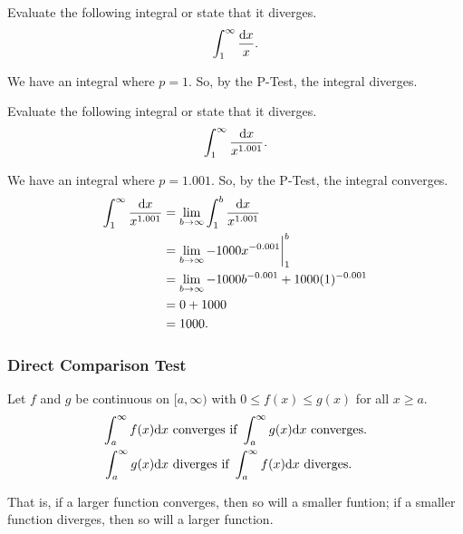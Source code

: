 \begin{example}
	Evaluate the following integral or state that it diverges.
	\begin{equation*}
		\int_{1}^{\infty}{\frac{\mathrm{d} x}{x}}.
	\end{equation*}
\end{example}
\begin{answer}
	We have an integral where $p=1$.
	So, by the P-Test, the integral diverges.
\end{answer}

\begin{example}
	Evaluate the following integral or state that it diverges.
	\begin{equation*}
		\int_{1}^{\infty}{\frac{\mathrm{d} x}{x^{1.001}}}.
	\end{equation*}
\end{example}
\begin{answer}
	We have an integral where $p=1.001$.
	So, by the P-Test, the integral converges.
	\begin{align*}
		\int_{1}^{\infty}{\frac{\mathrm{d} x}{x^{1.001}}} &= \lim_{b\to\infty}{\int_{1}^{b}{\frac{\mathrm{d} x}{x^{1.001}}}} \\
		&= \lim_{b\to\infty}{-1000x^{-0.001}\biggr\rvert_{1}^{b}} \\
		&= \lim_{b\to\infty}{-1000b^{-0.001}} + 1000(1)^{-0.001} \\
		&= 0 + 1000 \\
		&= 1000.
	\end{align*}
\end{answer}

\subsubsection{Direct Comparison Test}
\begin{lemma}
	Let $f$ and $g$ be continuous on $[a,\infty)$ with $0 \leq f(x) \leq g(x)$ for all $x \geq a$.
	\begin{align*}
		\int_{a}^{\infty}{f(x)\mathrm{d} x} &\text{ converges if } \int_{a}^{\infty}{g(x)\mathrm{d} x} \text{ converges.} \\
		\int_{a}^{\infty}{g(x)\mathrm{d} x} &\text{ diverges if } \int_{a}^{\infty}{f(x)\mathrm{d} x} \text{ diverges.}
	\end{align*}
\end{lemma}

That is, if a larger function converges, then so will a smaller funtion; if a smaller function diverges, then so will a larger function. \\



